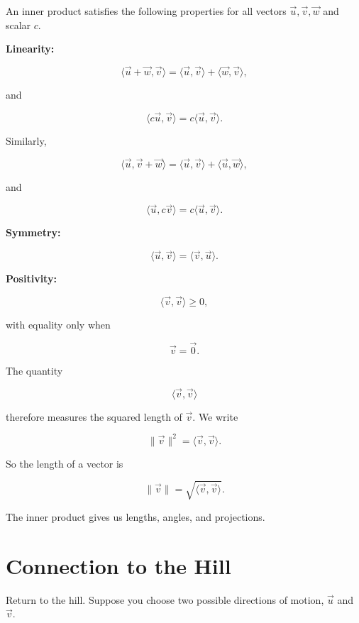\documentclass[11pt,openany]{book}
\theoremstyle{definition}
\begin{document}
An inner product satisfies the following properties for all vectors
\(\vec{u},\vec{v},\vec{w}\) and scalar \(c\).

\medskip

\textbf{Linearity:}

\[
\langle \vec{u}+\vec{w},\vec{v}\rangle
=
\langle \vec{u},\vec{v}\rangle
+
\langle \vec{w},\vec{v}\rangle,
\]

and

\[
\langle c\vec{u},\vec{v}\rangle
=
c\langle \vec{u},\vec{v}\rangle.
\]

Similarly,

\[
\langle \vec{u},\vec{v}+\vec{w}\rangle
=
\langle \vec{u},\vec{v}\rangle
+
\langle \vec{u},\vec{w}\rangle,
\]

and

\[
\langle \vec{u},c\vec{v}\rangle
=
c\langle \vec{u},\vec{v}\rangle.
\]

\medskip

\textbf{Symmetry:}

\[
\langle \vec{u},\vec{v}\rangle
=
\langle \vec{v},\vec{u}\rangle.
\]

\medskip

\textbf{Positivity:}

\[
\langle \vec{v},\vec{v}\rangle \geq 0,
\]

with equality only when

\[
\vec{v}=\vec{0}.
\]

The quantity

\[
\langle \vec{v},\vec{v}\rangle
\]

therefore measures the squared length of \(\vec{v}\). We write

\[
\|\vec{v}\|^2
=
\langle \vec{v},\vec{v}\rangle.
\]

So the length of a vector is

\[
\|\vec{v}\|
=
\sqrt{\langle \vec{v},\vec{v}\rangle}.
\]

\begin{keyidea}
The inner product gives us lengths, angles, and projections.
\end{keyidea}

\section{Connection to the Hill}

Return to the hill. Suppose you choose two possible directions of motion,
\(\vec{u}\) and \(\vec{v}\).
\end{document}
